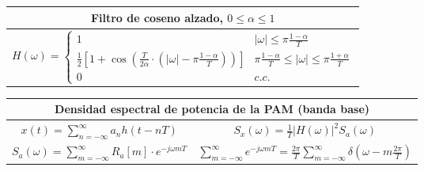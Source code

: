 \documentclass[es]{article}
\begin{document}
\begin{center}
        \renewcommand{\arraystretch}{1.5}
        \begin{tabular}{|c|}
            \multicolumn{1}{c}{{\bf Filtro de coseno alzado, $0 \leq \alpha \leq 1$}}\\
            \hline
            $H(\omega) = \left \{ \begin{array}{lc} 1 & |\omega| \leq \pi \displaystyle\frac{1-\alpha}{T} \\ \displaystyle\frac{1}{2} \left [ 1 + \cos \left ( \frac{T}{2\alpha} \cdot \left ( |\omega| - \pi \frac{1-\alpha}{T} \right ) \right ) \right ] & \pi \frac{1-\alpha}{T} \leq |\omega| \leq \pi \displaystyle\frac{1+\alpha}{T}\\ 0 & c.c. \end{array} \right. $ \\ 
            \hline
        \end{tabular}
        \renewcommand{\arraystretch}{1}
        \vspace{0.5cm}


    \renewcommand{\arraystretch}{2}
        \begin{tabular}{|c|c|}
            \multicolumn{2}{c}{{\bf Densidad espectral de potencia de la PAM (banda base)}}\\
            \hline
            $x(t) = \displaystyle\sum\limits_{n=-\infty}^{\infty} a_n h(t-nT)$ &
            $S_x(\omega) = \displaystyle\frac{1}{T} |H(\omega)|^2 S_a(\omega)$\\
            \hline
            $S_a(\omega) = \displaystyle\sum\limits_{m=-\infty}^{\infty} R_a[m] \cdot e^{-j\omega m T}$ &
            $\sum\limits_{m=-\infty}^\infty e^{-j\omega mT} = \frac{2\pi}{T} \sum\limits_{m=-\infty}^\infty \delta (\omega- m\frac{2\pi}{T} )$ \\
            \hline


\end{tabular}
\end{center}
\end{document}
